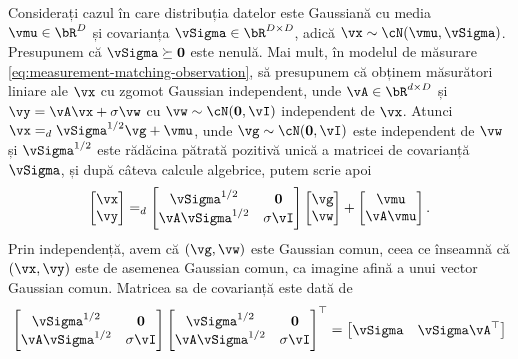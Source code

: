 \documentclass[../../book-main_ro.tex]{subfiles}
\begin{document}
\begin{example}\label{example:denoising-conditional-gaussian}
  Considerați cazul în care distribuția datelor este Gaussiană cu media $\vmu \in
  \bR^D$ și
  covarianța $\vSigma \in \bR^{D \times D}$, adică $\vx \sim \cN(\vmu, \vSigma)$.
  Presupunem că $\vSigma \succeq \Zero$ este nenulă.
  Mai mult, în modelul de măsurare \eqref{eq:measurement-matching-observation},
  să presupunem că obținem măsurători liniare ale $\vx$ cu zgomot Gaussian
  independent, unde $\vA \in \bR^{d \times D}$ și $\vy = \vA \vx + \sigma \vw$
  cu $\vw \sim \cN(\Zero, \vI)$ independent de $\vx$.
  Atunci $\vx =_{d} \vSigma^{1/2} \vg + \vmu$, unde $\vg \sim \cN(\Zero, \vI)$ este
  independent de $\vw$ și $\vSigma^{1/2}$ este rădăcina pătrată pozitivă unică a
  matricei de covarianță $\vSigma$, și
  după câteva calcule algebrice, putem scrie apoi
  \begin{equation*}
    \begin{bmatrix}
      \vx \\
      \vy
    \end{bmatrix}
    =_{d}
    \begin{bmatrix}
      \vSigma^{1/2} & \Zero \\
      \vA \vSigma^{1/2} & \sigma \vI
    \end{bmatrix}
    \begin{bmatrix}
      \vg \\
      \vw
    \end{bmatrix}
    +
    \begin{bmatrix}
      \vmu \\
      \vA\vmu
    \end{bmatrix}.
  \end{equation*}
  Prin independență, avem că $(\vg, \vw)$ este Gaussian comun, ceea ce înseamnă că
  $(\vx, \vy)$ este de asemenea Gaussian comun, ca imagine afină a unui
  vector Gaussian comun.
  Matricea sa de covarianță este dată de
  \begin{equation*}
    \begin{bmatrix}
      \vSigma^{1/2} & \Zero \\
      \vA \vSigma^{1/2} & \sigma \vI
    \end{bmatrix}
    \begin{bmatrix}
      \vSigma^{1/2} & \Zero \\
      \vA \vSigma^{1/2} & \sigma \vI
    \end{bmatrix}^\top
    =
    \begin{bmatrix}
      \vSigma & \vSigma \vA^\top \\

\end{bmatrix}
\end{equation*}
\end{example}
\end{document}
